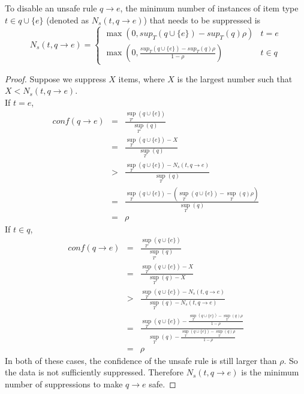 \begin{lemma}
\label{minimum}
To disable an unsafe rule $q \rightarrow e$, the minimum number of instances
of item type $t \in q\cup\{e\}$ (denoted as $N_s(t, q\rightarrow e)$) 
that needs to be suppressed is
\begin{equation}\label{eq:N_s}N_s(t, q\rightarrow e)=
\begin{cases}
\max(0, sup_T(q\cup \{e\})-sup_T(q)\rho) & t=e  \\
\max(0, \frac{sup_T(q\cup \{e\})-sup_T(q)\rho}{1-\rho}) & t\in q %
\end{cases}
\end{equation}
\end{lemma}
\begin{proof}
Suppose we suppress $X$ items, where $X$ is the largest number such that
$X<N_s(t, q\rightarrow e)$.\\
If $t = e$,
\begin{eqnarray*}
conf(q \to e)&=&\frac{{{{\sup }_{T'}}(q \cup \{ e\} )}}{{{{\sup }_{T'}}(q)}}\\
&=&\frac{{{{\sup }_T}(q \cup \{ e\} ) - X}}{{{{\sup }_T}(q)}}\\
&>&\frac{{{{\sup }_T}(q \cup \{ e\} ) - {N_s}(t,q \to e)}}{{{{\sup }_T}(q)}}\\
&=&\frac{{{{\sup }_T}(q \cup \{ e\} ) - ({{\sup }_T}(q \cup \{ e\} ) - {{\sup }_T}(q)\rho )}}{{{{\sup }_T}(q)}}\\
&=&\rho
\end{eqnarray*}
If $t\in q$,
\begin{eqnarray*}
conf(q \to e)&=&\frac{{{{\sup }_{T'}}(q \cup \{ e\} )}}{{{{\sup }_{T'}}(q)}}\\
&=&\frac{{{{\sup }_T}(q \cup \{ e\} ) - X}}{{{{\sup }_T}(q) - X}}\\
&>&\frac{{{{\sup }_T}(q \cup \{ e\} ) - {N_s}(t,q \to e)}}{{{{\sup }_T}(q) - {N_s}(t,q \to e)}}\\
&=&\frac{{{{\sup }_T}(q \cup \{ e\} ) - \frac{{{{\sup }_T}(q \cup \{ e\} ) - {{\sup }_T}(q)\rho }}{{1 - \rho }}}}{{{{\sup }_T}(q) - \frac{{{{\sup }_T}(q \cup \{ e\} ) - {{\sup }_T}(q)\rho }}{{1 - \rho }}}}\\
&=& \rho
\end{eqnarray*}
In both of these cases, the confidence of the unsafe rule is still larger than $\rho$.
 So the data is not sufficiently suppressed. Therefore $N_s(t, q\rightarrow e)$ is the minimum number of suppressions to make $q \rightarrow e$ safe.
\end{proof}

